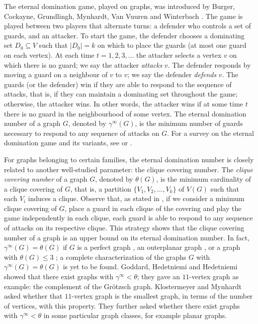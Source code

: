 \documentclass[11pt]{article}
\begin{document}
The eternal domination game, played on graphs, was introduced by Burger, Cockayne, Grundlingh, Mynhardt, Van Vuuren and Winterbach \cite{burger2004infinite}. The game is played between two players that alternate turns: a defender who controls a set of guards, and an attacker. To start the game, the defender chooses a dominating set $D_0 \subseteq V$ such that $|D_0|=k$ on which to place the guards (at most one guard on each vertex). At each time $t=1, 2, 3, \ldots$ the attacker selects a vertex $v$ on which there is no guard; we say the attacker \textit{attacks} $v$. The defender responds by moving a guard on a neighbour of $v$ to $v$; we say the defender \textit{defends} $v$. The guards (or the defender) win if they are able to respond to the sequence of attacks, that is, if they can maintain a dominating set throughout the game; otherwise, the attacker wins. In other words, the attacker wins if at some time $t$ there is no guard in the neighbourhood of some vertex. The eternal domination number of a graph $G$, denoted by $\gamma^\infty(G)$, is the minimum number of guards necessary to respond to any sequence of attacks on $G$. For a survey on the eternal domination game and its variants, see \cite{klostermeyer2016protecting} or \cite{klostermeyer2020eternal}.

For graphs belonging to certain families, the eternal domination number is closely related to another well-studied parameter: the clique covering number. The \emph{clique covering number} of a graph $G$, denoted by $\theta(G)$, is the minimum cardinality of a clique covering of $G$, that is, a partition $\{V_1, V_2, \ldots, V_k\}$ of $V(G)$ such that each $V_i$ induces a clique. Observe that, as stated in \cite{burger2004infinite}, if we consider a minimum clique covering of $G$, place a guard in each clique of the covering and play the game independently in each clique, each guard is able to respond to any sequence of attacks on its respective clique. This strategy shows that the clique covering number of a graph is an upper bound on its eternal domination number. In fact, $\gamma^\infty(G)=\theta(G)$ if $G$ is a perfect graph \cite{burger2004infinite}, an outerplanar graph \cite{anderson2007maximum}, or a graph with $\theta(G) \leq 3$ \cite{burger2004infinite}; a complete characterization of the graphs $G$ with $\gamma^\infty(G)=\theta(G)$ is yet to be found. Goddard, Hedetniemi and Hedetniemi \cite{goddard2005eternal} showed that there exist graphs with $\gamma^\infty<\theta$; they gave an $11$-vertex graph as example: the complement of the Gr\"otzsch graph. Klostermeyer and Mynhardt \cite{klostermeyer2016protecting} asked whether that $11$-vertex graph is the smallest graph, in terms of the number of vertices, with this property. They further asked whether there exist graphs with $\gamma^\infty < \theta$ in some particular graph classes, for example planar graphs.
\end{document}
